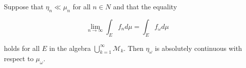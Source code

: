 Suppose that $\eta_n \ll \mu_n$ for all $n \in N$ and that the equality

$$\lim_{n \to \infty} \int_E f_n d\mu = \int_E f_\omega d\mu$$

holds for all $E$ in the algebra $\bigcup_{k=1}^{\infty} \mathcal{M}_k$. Then $\eta_\omega$ is absolutely continuous with respect to $\mu_\omega$.
